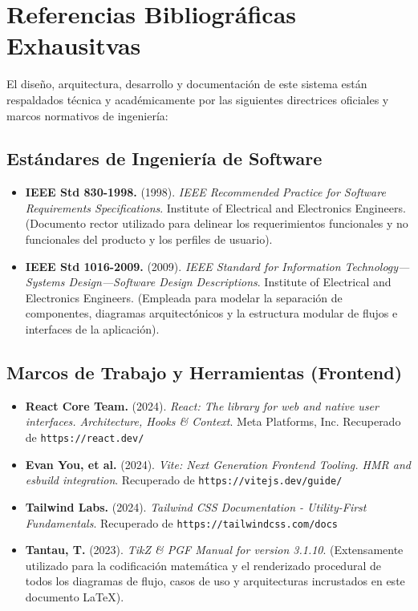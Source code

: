 \section{Referencias Bibliográficas Exhausitvas}

El diseño, arquitectura, desarrollo y documentación de este sistema están respaldados técnica y académicamente por las siguientes directrices oficiales y marcos normativos de ingeniería:

\subsection{Estándares de Ingeniería de Software}
\begin{itemize}
    \item \textbf{IEEE Std 830-1998.} (1998). \textit{IEEE Recommended Practice for Software Requirements Specifications}. Institute of Electrical and Electronics Engineers. (Documento rector utilizado para delinear los requerimientos funcionales y no funcionales del producto y los perfiles de usuario).
    \item \textbf{IEEE Std 1016-2009.} (2009). \textit{IEEE Standard for Information Technology—Systems Design—Software Design Descriptions}. Institute of Electrical and Electronics Engineers. (Empleada para modelar la separación de componentes, diagramas arquitectónicos y la estructura modular de flujos e interfaces de la aplicación).
\end{itemize}

\subsection{Marcos de Trabajo y Herramientas (Frontend)}
\begin{itemize}
    \item \textbf{React Core Team.} (2024). \textit{React: The library for web and native user interfaces. Architecture, Hooks \& Context}. Meta Platforms, Inc. Recuperado de \texttt{https://react.dev/}
    \item \textbf{Evan You, et al.} (2024). \textit{Vite: Next Generation Frontend Tooling. HMR and esbuild integration}. Recuperado de \texttt{https://vitejs.dev/guide/}
    \item \textbf{Tailwind Labs.} (2024). \textit{Tailwind CSS Documentation - Utility-First Fundamentals}. Recuperado de \texttt{https://tailwindcss.com/docs}
    \item \textbf{Tantau, T.} (2023). \textit{TikZ \& PGF Manual for version 3.1.10}. (Extensamente utilizado para la codificación matemática y el renderizado procedural de todos los diagramas de flujo, casos de uso y arquitecturas incrustados en este documento LaTeX).
\end{itemize}

